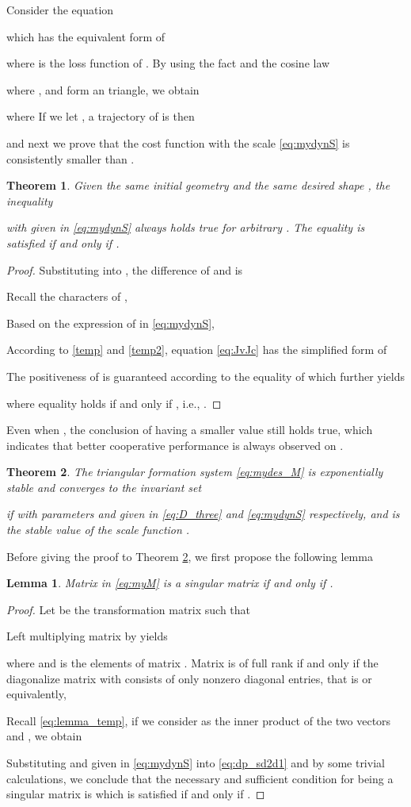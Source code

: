 \documentclass[times]{rncauth}
\newtheorem{thm}{Theorem}[section]
\newtheorem{lem}{Lemma}[section]
\begin{document}
Consider the equation

which has the equivalent form of

  where  is the loss function of .
By using the fact   and
the cosine law

where ,  and  form an triangle, we obtain

where
 If we let
,  a trajectory of
 is then

and next we prove that the cost function  with the scale
 \eqref{eq:mydynS} is consistently smaller than .
\begin{thm}\label{thm:JvJc}
  Given the same initial geometry  and the same desired shape , the inequality
  
  with  given in \eqref{eq:mydynS}
  always holds true for arbitrary . The
  equality is satisfied if and only if .
\end{thm}
\begin{proof}
  Substituting  into , the difference of  and
   is
  
Recall the characters of ,

Based on the expression of  in \eqref{eq:mydynS},

According to \eqref{temp} and \eqref{temp2}, equation
\eqref{eq:JvJc} has the simplified form of
  
  The positiveness of  is guaranteed according to the equality of
   which further
  yields
  
  where equality holds if and only if ,
i.e., .
\end{proof}

 Even when , the conclusion of  having a smaller
value still holds true, which indicates that better
cooperative performance is always observed on .


\begin{thm}\label{thm:stable}
The triangular formation system \eqref{eq:mydes_M} is exponentially
stable and converges to the invariant set

if
 with parameters  and 
given in \eqref{eq:D_three} and \eqref{eq:mydynS} respectively, and
 is the stable value of the scale function
.
\end{thm}
Before giving the proof to Theorem \ref{thm:stable}, we first
propose the following lemma
\begin{lem}\label{lemma:M_nonsigular}
  Matrix  in \eqref{eq:myM} is a singular matrix
  if and only if .
\end{lem}
\begin{proof}
Let  be the transformation matrix such that

Left multiplying matrix  by  yields

where
 and 
is the elements of matrix . Matrix  is of
full rank if and only if the diagonalize matrix
 with
 consists of only
nonzero diagonal entries, that is  or equivalently,

Recall \eqref{eq:lemma_temp}, if we consider  as
the inner product of the two vectors  and , we obtain

Substituting  and  given in \eqref{eq:mydynS}  into
\eqref{eq:dp_sd2d1} and by some trivial calculations, we conclude
that the necessary and sufficient condition for 
being a singular matrix is
 which is
satisfied if and only if .
\end{proof}
\end{document}
